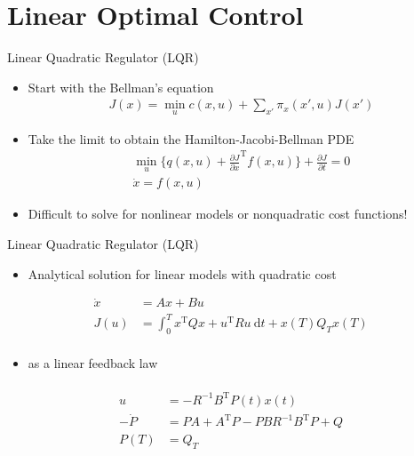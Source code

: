 \documentclass[handout]{beamer}
\begin{document}
\section{Linear Optimal Control}
%
\begin{frame}{Linear Quadratic Regulator (LQR)}
\begin{itemize}
\item Start with the Bellman's equation
\begin{equation*}
\begin{aligned}
J(x) = \min_u c(x,u) + \sum_{x'} \pi_x(x',u)J(x')
\end{aligned}
\end{equation*}
\item Take the limit to obtain the Hamilton-Jacobi-Bellman PDE 
\begin{eqnarray}
\min_u \{ q(x,u) + \frac{\partial J}{\partial x}^{\mathrm{T}}f(x,u) \} + \frac{\partial J}{\partial t} = 0 \\
\dot{x} = f(x,u)
\end{eqnarray}
\item Difficult to solve for nonlinear models or nonquadratic cost functions!
\end{itemize}
\end{frame}
%
\begin{frame}{Linear Quadratic Regulator (LQR)}
\begin{itemize}
\item Analytical solution for linear models with quadratic cost
\end{itemize}
\begin{equation}
\begin{aligned}
\dot{x} &= Ax + Bu \\
J(u) &= \int_{0}^{T} x^{\mathrm{T}}Qx + u^{\mathrm{T}}Ru \ \mathrm{d}t + x(T)Q_{T}x(T) \\
\end{aligned}
\end{equation}
\begin{itemize}
\item as a linear feedback law
\end{itemize}
\begin{equation}
\begin{aligned}
\\
u &= -R^{-1}B^{\mathrm{T}}P(t)x(t) \\
-\dot{P} &= PA + A^{\mathrm{T}}P - PBR^{-1}B^{\mathrm{T}}P + Q \\ 
P(T) &= Q_{T}
\end{aligned}
\end{equation}
\end{frame}
\end{document}
